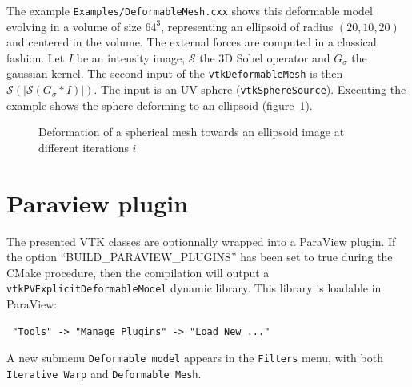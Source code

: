 \documentclass{InsightArticle}
\begin{document}
The example \verb!Examples/DeformableMesh.cxx! shows this deformable model 
evolving in a volume of size $64^3$, representing an ellipsoid of radius 
$(20,10,20)$ and centered in the volume. The external forces are computed in a 
classical fashion. Let $I$ be an intensity image, $\mathcal{S}$ the 3D Sobel
operator and $G_\sigma$ the gaussian kernel. The second input of the 
\verb!vtkDeformableMesh! is then $\mathcal{S}(|\mathcal{S}(G_\sigma * I)|)$. The
input is an UV-sphere (\verb!vtkSphereSource!). Executing the example shows the
sphere deforming to an ellipsoid (figure~\ref{fig:deform-sphere}).
%
\begin{figure}
\centering
\caption{Deformation of a spherical mesh towards an ellipsoid image at different
iterations $i$}
\label{fig:deform-sphere}
\end{figure}

%
\section{Paraview plugin}
%
The presented VTK classes are optionnally wrapped into a ParaView plugin. If 
the option ``BUILD\_PARAVIEW\_PLUGINS'' has been set to true during the CMake 
procedure, then the compilation will output a \verb!vtkPVExplicitDeformableModel!
dynamic library. This library is loadable in ParaView:
%
\begin{verbatim}
 "Tools" -> "Manage Plugins" -> "Load New ..."
\end{verbatim}
%
A new submenu \verb!Deformable model! appears in the \verb!Filters! menu, with
both \verb!Iterative Warp! and \verb!Deformable Mesh!.
%
\end{document}
